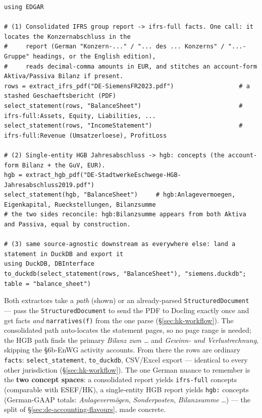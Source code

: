 \documentclass[11pt,a4paper]{report}
\begin{document}
\begin{lstlisting}
using EDGAR

# (1) Consolidated IFRS group report -> ifrs-full facts. One call: it locates the Konzernabschluss in the
#     report (German "Konzern-..." / "... des ... Konzerns" / "...-Gruppe" headings, or the English edition),
#     reads decimal-comma amounts in EUR, and stitches an account-form Aktiva/Passiva Bilanz if present.
rows = extract_ifrs_pdf("DE-SiemensFR2023.pdf")                  # a stashed Geschaeftsbericht (PDF)
select_statement(rows, "BalanceSheet")                           # ifrs-full:Assets, Equity, Liabilities, ...
select_statement(rows, "IncomeStatement")                        # ifrs-full:Revenue (Umsatzerloese), ProfitLoss

# (2) Single-entity HGB Jahresabschluss -> hgb: concepts (the account-form Bilanz + the GuV, EUR).
hgb = extract_hgb_pdf("DE-StadtwerkeEschwege-HGB-Jahresabschluss2019.pdf")
select_statement(hgb, "BalanceSheet")     # hgb:Anlagevermoegen, Eigenkapital, Rueckstellungen, Bilanzsumme
# the two sides reconcile: hgb:Bilanzsumme appears from both Aktiva and Passiva, equal by construction.

# (3) same source-agnostic downstream as everywhere else: land a statement in DuckDB and export it
using DuckDB, DBInterface
to_duckdb(select_statement(rows, "BalanceSheet"), "siemens.duckdb"; table = "balance_sheet")
\end{lstlisting}

\noindent Both extractors take a \emph{path} (shown) or an already-parsed \texttt{StructuredDocument} --- pass
the \texttt{StructuredDocument} to send the PDF to Docling exactly once and get facts \emph{and}
\texttt{narratives(f)} from the one parse (\S\ref{sec:hk-workflow}). The consolidated path auto-locates the
statement pages, so no page range is needed; the HGB path finds the primary \emph{Bilanz zum \ldots} and
\emph{Gewinn- und Verlustrechnung}, skipping the \S6b-EnWG activity accounts. From there the rows are ordinary
\texttt{facts}: \texttt{select\_statement}, \texttt{to\_duckdb}, CSV/Excel export --- identical to every other
jurisdiction (\S\ref{sec:hk-workflow}). The one German nuance to remember is the \textbf{two concept spaces}:
a consolidated report yields \texttt{ifrs-full} concepts (comparable with ESEF/HK), a single-entity HGB report
yields \texttt{hgb:} concepts (German-GAAP totals: \emph{Anlagevermögen}, \emph{Sonderposten}, \emph{Bilanzsumme}
\ldots) --- the split of \S\ref{sec:de-accounting-flavours}, made concrete.
\end{document}
